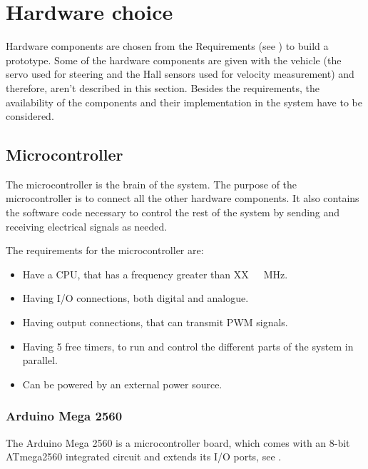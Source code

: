 \section{Hardware choice} \label{Hardwarechoice}
Hardware components are chosen from the Requirements (see ) to build a prototype. 
Some of the hardware components are given with the vehicle (the servo used for steering and the Hall sensors used for velocity measurement) and therefore, aren't described in this section. 
Besides the requirements, the availability of the components and their implementation in the system have to be considered.


\subsection{Microcontroller}
The microcontroller is the brain of the system. The purpose of the microcontroller is to connect all the other hardware components. It also contains the software code necessary to control the rest of the system by sending and receiving electrical signals as needed.

The requirements for the microcontroller are:
\begin{itemize}
\item Have a CPU, that has a frequency greater than \si{XX\ MHz}. 
\item Having I/O connections, both digital and analogue.
\item Having output connections, that can transmit PWM signals.
\item Having 5 free timers, to run and control the different parts of the system in parallel.
\item Can be powered by an external power source.
\end{itemize}

\subsubsection{Arduino Mega 2560}
The Arduino Mega 2560 is a microcontroller board, which comes with an 8-bit ATmega2560 integrated circuit and extends its I/O ports, see  \cite{MegaInfo}. 

